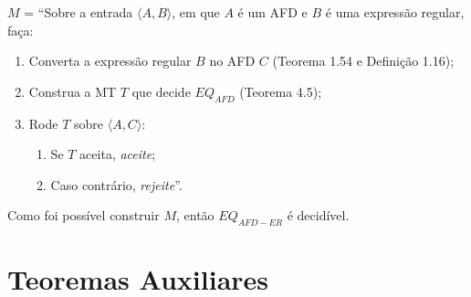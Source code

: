 \documentclass[12pt,a4paper,oneside]{article}
\begin{document}
\begin{enumerate}
{	$M$ = ``Sobre a entrada $\langle A, B\rangle$, em que $A$ é um AFD e $B$ é uma expressão regular, faça:
	\begin{enumerate}
		\item Converta a expressão regular $B$ no AFD $C$ (Teorema 1.54 e Definição 1.16);
		\item Construa a MT $T$ que decide $EQ_{AFD}$ (Teorema 4.5);
		\item Rode $T$ sobre $\langle A, C\rangle$:
		\begin{enumerate}
			\item Se $T$ aceita, {\it aceite};
			\item Caso contrário, {\it rejeite}''.
		\end{enumerate}
	\end{enumerate}
	Como foi possível construir $M$, então $EQ_{AFD-ER}$ é decidível.
	}
\end{enumerate}

\section*{Teoremas Auxiliares}
\end{document}
